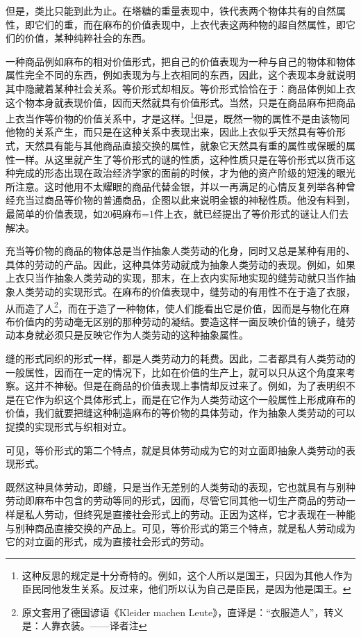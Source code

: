 \documentclass{ctexbook}
\begin{document}
            但是，类比只能到此为止。在塔糖的重量表现中，铁代表两个物体共有的自然属性，即它们的重，而在麻布的价值表现中，上衣代表这两种物的超自然属性，即它们的价值，某种纯粹社会的东西。
            
            一种商品例如麻布的相对价值形式，把自己的价值表现为一种与自己的物体和物体属性完全不同的东西，例如表现为与上衣相同的东西，因此，这个表现本身就说明其中隐藏着某种社会关系。等价形式却相反。等价形式恰恰在于：商品体例如上衣这个物本身就表现价值，因而天然就具有价值形式。当然，只是在商品麻布把商品上衣当作等价物的价值关系中，才是这样。\footnote{这种反思的规定是十分奇特的。例如，这个人所以是国王，只因为其他人作为臣民同他发生关系。反过来，他们所以认为自己是臣民，是因为他是国王。}但是，既然一物的属性不是由该物同他物的关系产生，而只是在这种关系中表现出来，因此上衣似乎天然具有等价形式，天然具有能与其他商品直接交换的属性，就象它天然具有重的属性或保暖的属性一样。从这里就产生了等价形式的谜的性质，这种性质只是在等价形式以货币这种完成的形态出现在政治经济学家的面前的时候，才为他的资产阶级的短浅的眼光所注意。这时他用不太耀眼的商品代替金银，并以一再满足的心情反复列举各种曾经充当过商品等价物的普通商品，企图以此来说明金银的神秘性质。他没有料到，最简单的价值表现，如20码麻布=1件上衣，就已经提出了等价形式的谜让人们去解决。
            
            充当等价物的商品的物体总是当作抽象人类劳动的化身，同时又总是某种有用的、具体的劳动的产品。因此，这种具体劳动就成为抽象人类劳动的表现。例如，如果上衣只当作抽象人类劳动的实现，那末，在上衣内实际地实现的缝劳动就只当作抽象人类劳动的实现形式。在麻布的价值表现中，缝劳动的有用性不在于造了衣服，从而造了人\footnote{原文套用了德国谚语《Kleider machen Leute》，直译是：“衣服造人”，转义是：人靠衣装。——译者注}，而在于造了一种物体，使人们能看出它是价值，因而是与物化在麻布价值内的劳动毫无区别的那种劳动的凝结。要造这样一面反映价值的镜子，缝劳动本身就必须只是反映它作为人类劳动的这种抽象属性。
            
            缝的形式同织的形式一样，都是人类劳动力的耗费。因此，二者都具有人类劳动的一般属性，因而在一定的情况下，比如在价值的生产上，就可以只从这个角度来考察。这并不神秘。但是在商品的价值表现上事情却反过来了。例如，为了表明织不是在它作为织这个具体形式上，而是在它作为人类劳动这个一般属性上形成麻布的价值，我们就要把缝这种制造麻布的等价物的具体劳动，作为抽象人类劳动的可以捉摸的实现形式与织相对立。
            
            可见，等价形式的第二个特点，就是具体劳动成为它的对立面即抽象人类劳动的表现形式。
            
            既然这种具体劳动，即缝，只是当作无差别的人类劳动的表现，它也就具有与别种劳动即麻布中包含的劳动等同的形式，因而，尽管它同其他一切生产商品的劳动一样是私人劳动，但终究是直接社会形式上的劳动。正因为这样，它才表现在一种能与别种商品直接交换的产品上。可见，等价形式的第三个特点，就是私人劳动成为它的对立面的形式，成为直接社会形式的劳动。
            
\end{document}
